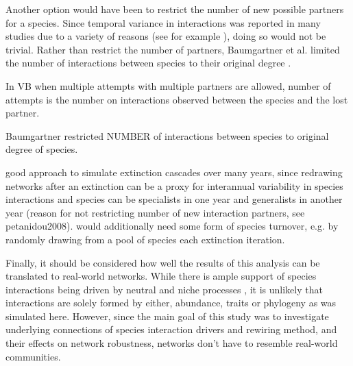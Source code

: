 \documentclass[12pt,a4paper]{article}
\begin{document}
Another option would have been to restrict the number of new possible partners for a species. Since temporal variance in interactions was reported in many studies due to a variety of reasons (see for example \cite{Olesen2008, CaraDonna2017, Schwarz2021}), doing so would not be trivial. Rather than restrict the number of partners, Baumgartner et al. limited the number of interactions between species to their original degree \parencite{Baumgartner2020}. 

In VB when multiple attempts with multiple partners are allowed, number of attempts is the number on interactions observed between the species and the lost partner.

Baumgartner restricted NUMBER of interactions between species to original degree of species.


good approach to simulate extinction cascades over many years, since redrawing networks after an extinction can be a proxy for interannual variability in species interactions and species can be specialists in one year and generalists in another year (reason for not restricting number of new interaction partners, see petanidou2008). would additionally need some form of species turnover, e.g. by randomly drawing from a pool of species each extinction iteration.

Finally, it should be considered how well the results of this analysis can be translated to real-world networks. While there is ample support of species interactions being driven by neutral and niche processes \parencite{Jordano2003, Rezende2007, Vazquez2007, Bluethgen2008}, it is unlikely that interactions are solely formed by either, abundance, traits or phylogeny as was simulated here. However, since the main goal of this study was to investigate underlying
connections of species interaction drivers and rewiring method, and their effects on network robustness, networks don't have to resemble real-world communities.
\end{document}
